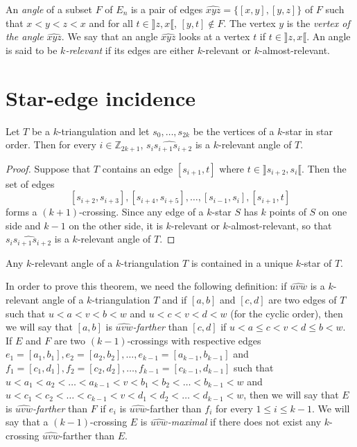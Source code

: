 \documentclass[12pt]{amsart}
\begin{document}
An \emph{angle} of a subset $F$ of $E_n$ is a pair of edges $\widehat{xyz}=\{[x,y],[y,z]\}$ of $F$ such that $x<y<z<x$ and for all $t\in\rrbracket z,x\llbracket$, $[y,t]\notin F$. The vertex $y$ is the \emph{vertex of the angle} $\widehat{xyz}$. We say that an angle $\widehat{xyz}$ looks at a vertex $t$ if $t\in\rrbracket z,x\llbracket$. An angle is said to be \emph{$k$-relevant} if its edges are either $k$-relevant or $k$-almost-relevant. 

\section{Star-edge incidence}

\begin{lemma}\label{starcaracterization}
Let $T$ be a $k$-triangulation and let $s_0,\ldots,s_{2k}$ be the vertices of a $k$-star in star order. Then for every $i\in\mathbb{Z}_{2k+1}$, $\widehat{s_{i}s_{i+1}s_{i+2}}$ is a $k$-relevant angle of $T$.
\end{lemma}

\begin{proof}
Suppose that $T$ contains an edge $[s_{i+1},t]$ where $t\in\rrbracket s_{i+2},s_i\llbracket$. Then the set of edges $$[s_{i+2},s_{i+3}],[s_{i+4},s_{i+5}],\ldots,[s_{i-1},s_{i}],[s_{i+1},t]$$ forms a $(k+1)$-crossing. Since any edge of a $k$-star $S$ has $k$ points  of $S$ on one side and $k-1$ on the other side, it is $k$-relevant or $k$-almost-relevant, so that $\widehat{s_{i}s_{i+1}s_{i+2}}$ is a $k$-relevant angle of $T$.
\end{proof}

\begin{theorem}\label{angle}
Any $k$-relevant angle of a $k$-triangulation $T$ is contained in a unique $k$-star of $T$.
\end{theorem}

In order to prove this theorem, we need the following definition: if $\widehat{uvw}$ is a $k$-relevant angle of a $k$-triangulation $T$ and if $[a,b]$ and $[c,d]$ are two edges of $T$ such that $u<a<v<b<w$ and $u<c<v<d<w$ (for the cyclic order), then we will say that $[a,b]$ is \emph{$\widehat{uvw}$-farther} than $[c,d]$ if $u<a\le c<v<d\le b<w$. If $E$ and $F$ are two $(k-1)$-crossings with respective edges $e_1=[a_1,b_1],e_2=[a_2,b_2],\ldots,e_{k-1}=[a_{k-1},b_{k-1}]$ and $f_1=[c_1,d_1],f_2=[c_2,d_2],\ldots,f_{k-1}=[c_{k-1},d_{k-1}]$ such that $u<a_1<a_2<\ldots<a_{k-1}<v<b_1<b_2<\ldots<b_{k-1}<w$ and $u<c_1<c_2<\ldots<c_{k-1}<v<d_1<d_2<\ldots<d_{k-1}<w$, then we will say that $E$ is \emph{$\widehat{uvw}$-farther} than $F$ if $e_i$ is $\widehat{uvw}$-farther than $f_i$ for every $1\le i\le k-1$. We will say that a $(k-1)$-crossing $E$ is \emph{$\widehat{uvw}$-maximal} if there does not exist any $k$-crossing $\widehat{uvw}$-farther than $E$.
\end{document}
